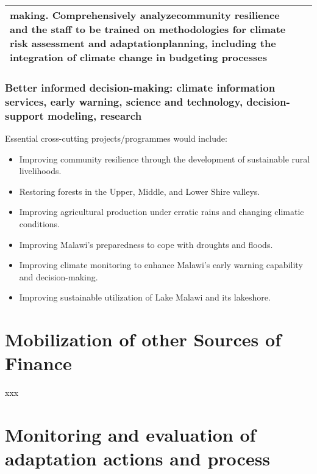\documentclass[
]{book}
\begin{document}
\begin{longtable}[]{@{}
  >{\raggedright\arraybackslash}p{}
  >{\raggedright\arraybackslash}p{}@{}}
making. Comprehensively analyzecommunity resilience and the staff to be trained on methodologies for climate risk assessment and adaptationplanning, including the integration of climate change in budgeting processes \\
\midrule
\endhead
\bottomrule
\end{longtable}

\hypertarget{better-informed-decision-making-climate-information-services-early-warning-science-and-technology-decision-support-modeling-research}{%
\subsection{Better informed decision-making: climate information services, early warning, science and technology, decision-support modeling, research}\label{better-informed-decision-making-climate-information-services-early-warning-science-and-technology-decision-support-modeling-research}}

Essential cross-cutting projects/programmes would include:

\begin{itemize}
\item
  Improving community resilience through the development of sustainable rural livelihoods.
\item
  Restoring forests in the Upper, Middle, and Lower Shire valleys.
\item
  Improving agricultural production under erratic rains and changing climatic conditions.
\item
  Improving Malawi's preparedness to cope with droughts and floods.
\item
  Improving climate monitoring to enhance Malawi's early warning capability and decision-making.
\item
  Improving sustainable utilization of Lake Malawi and its lakeshore.
\end{itemize}

\hypertarget{mobilization-of-other-sources-of-finance}{%
\chapter{Mobilization of other Sources of Finance}\label{mobilization-of-other-sources-of-finance}}

xxx

\hypertarget{monitoring-and-evaluation-of-adaptation-actions-and-process}{%
\chapter{Monitoring and evaluation of adaptation actions and process}\label{monitoring-and-evaluation-of-adaptation-actions-and-process}}
\end{document}
